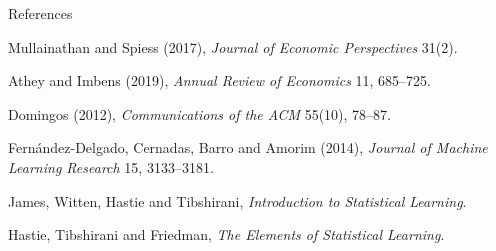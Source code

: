 \documentclass[aspectratio=169,11pt]{beamer}
\newenvironment{wideitemize}{\itemize\addtolength{\itemsep}{9pt}}{\enditemize}
\begin{document}
\begin{frame}{References}
\small
\begin{wideitemize}
  \item Mullainathan and Spiess (2017), \emph{Journal of Economic Perspectives} 31(2).
  \item Athey and Imbens (2019), \emph{Annual Review of Economics} 11, 685--725.
  \item Domingos (2012), \emph{Communications of the ACM} 55(10), 78--87.
  \item Fern\'andez-Delgado, Cernadas, Barro and Amorim (2014),
        \emph{Journal of Machine Learning Research} 15, 3133--3181.
  \item James, Witten, Hastie and Tibshirani, \emph{Introduction to Statistical Learning}.
  \item Hastie, Tibshirani and Friedman, \emph{The Elements of Statistical Learning}.
\end{wideitemize}
\end{frame}
\end{document}

